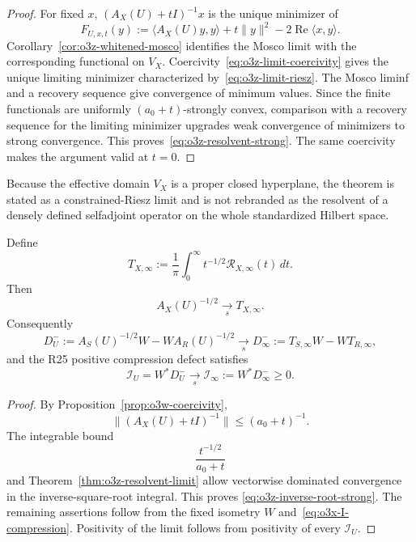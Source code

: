 \begin{proof}
For fixed $x$, $(A_X(U)+tI)^{-1}x$ is the unique minimizer of
\[
 F_{U,x,t}(y)
 :=\langle A_X(U)y,y\rangle+t\|y\|^2
 -2\operatorname{Re}\langle x,y\rangle.
\]
Corollary~\ref{cor:o3z-whitened-mosco} identifies the Mosco limit with the corresponding
functional on $V_X$.  Coercivity~\eqref{eq:o3z-limit-coercivity} gives the unique
limiting minimizer characterized by~\eqref{eq:o3z-limit-riesz}.  The Mosco liminf and
a recovery sequence give convergence of minimum values.  Since the finite functionals
are uniformly $(a_0+t)$-strongly convex, comparison with a recovery sequence for the
limiting minimizer upgrades weak convergence of minimizers to strong convergence.  This
proves~\eqref{eq:o3z-resolvent-strong}.  The same coercivity makes the argument valid at
$t=0$.
\end{proof}

Because the effective domain $V_X$ is a proper closed hyperplane, the theorem is stated
as a constrained-Riesz limit and is not rebranded as the resolvent of a densely defined
selfadjoint operator on the whole standardized Hilbert space.

\begin{corollary}
\label{cor:o3z-inverse-root-limit}
Define
\[
 \boxed{
 T_{X,\infty}
 :=\frac1\pi\int_0^\infty
 t^{-1/2}\mathcal R_{X,\infty}(t)\,dt.
 }
\tag{O3Z.10}\label{eq:o3z-T-limit}
\]
Then
\[
 \boxed{
 A_X(U)^{-1/2}\xrightarrow[s]{}T_{X,\infty}.
 }
\tag{O3Z.11}\label{eq:o3z-inverse-root-strong}
\]
Consequently
\[
 \boxed{
 D_U^-:=A_S(U)^{-1/2}W-WA_R(U)^{-1/2}
 \xrightarrow[s]{}
 D_\infty^-:=T_{S,\infty}W-WT_{R,\infty},
 }
\tag{O3Z.12}\label{eq:o3z-D-limit}
\]
and the R25 positive compression defect satisfies
\[
 \boxed{
 \mathscr I_U=W^*D_U^-
 \xrightarrow[s]{}
 \mathscr I_\infty:=W^*D_\infty^-\ge0.
 }
\tag{O3Z.13}\label{eq:o3z-I-limit}
\]
\end{corollary}

\begin{proof}
By Proposition~\ref{prop:o3w-coercivity},
\[
 \|(A_X(U)+tI)^{-1}\|\le(a_0+t)^{-1}.
\]
The integrable bound
\[
 \frac{t^{-1/2}}{a_0+t}
\]
and Theorem~\ref{thm:o3z-resolvent-limit} allow vectorwise dominated convergence in
the inverse-square-root integral.  This proves
\eqref{eq:o3z-inverse-root-strong}.  The remaining assertions follow from the fixed
isometry $W$ and~\eqref{eq:o3x-I-compression}.  Positivity of the limit follows from
positivity of every $\mathscr I_U$.
\end{proof}

